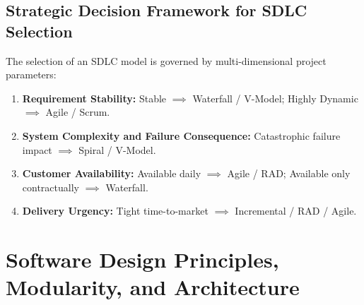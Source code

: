 \subsection{Strategic Decision Framework for SDLC Selection}
The selection of an SDLC model is governed by multi-dimensional project parameters:
\begin{enumerate}
    \item \textbf{Requirement Stability:} Stable $\implies$ Waterfall / V-Model; Highly Dynamic $\implies$ Agile / Scrum.
    \item \textbf{System Complexity and Failure Consequence:} Catastrophic failure impact $\implies$ Spiral / V-Model.
    \item \textbf{Customer Availability:} Available daily $\implies$ Agile / RAD; Available only contractually $\implies$ Waterfall.
    \item \textbf{Delivery Urgency:} Tight time-to-market $\implies$ Incremental / RAD / Agile.
\end{enumerate}



\section{Software Design Principles, Modularity, and Architecture}
\label{sec:se_design_principles}

